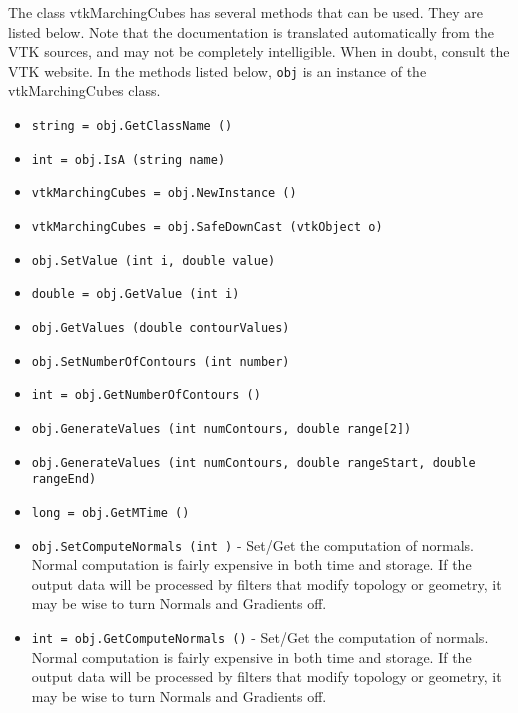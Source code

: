 The class vtkMarchingCubes has several methods that can be used.
  They are listed below.
Note that the documentation is translated automatically from the VTK sources,
and may not be completely intelligible.  When in doubt, consult the VTK website.
In the methods listed below, \verb|obj| is an instance of the vtkMarchingCubes class.
\begin{itemize}
\item  \verb|string = obj.GetClassName ()|

\item  \verb|int = obj.IsA (string name)|

\item  \verb|vtkMarchingCubes = obj.NewInstance ()|

\item  \verb|vtkMarchingCubes = obj.SafeDownCast (vtkObject o)|

\item  \verb|obj.SetValue (int i, double value)|

\item  \verb|double = obj.GetValue (int i)|

\item  \verb|obj.GetValues (double contourValues)|

\item  \verb|obj.SetNumberOfContours (int number)|

\item  \verb|int = obj.GetNumberOfContours ()|

\item  \verb|obj.GenerateValues (int numContours, double range[2])|

\item  \verb|obj.GenerateValues (int numContours, double rangeStart, double rangeEnd)|

\item  \verb|long = obj.GetMTime ()|

\item  \verb|obj.SetComputeNormals (int )| -  Set/Get the computation of normals. Normal computation is fairly
 expensive in both time and storage. If the output data will be
 processed by filters that modify topology or geometry, it may be
 wise to turn Normals and Gradients off.

\item  \verb|int = obj.GetComputeNormals ()| -  Set/Get the computation of normals. Normal computation is fairly
 expensive in both time and storage. If the output data will be
 processed by filters that modify topology or geometry, it may be
 wise to turn Normals and Gradients off.


\end{itemize}
